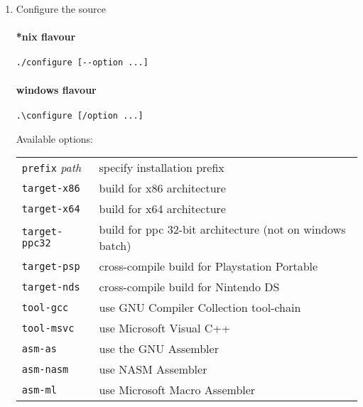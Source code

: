 \begin{enumerate}
\item Configure the source

\paragraph{*nix flavour}
\begin{lstlisting}
./configure [--option ...]
\end{lstlisting}

\paragraph{windows flavour}

\begin{lstlisting}
.\configure [/option ...]
\end{lstlisting}

Available options:

\begin{tabular}{ll}	
{\tt prefix} {\it path} & specify installation prefix \\
{\tt target-x86}   & build for x86 architecture \\
{\tt target-x64}   & build for x64 architecture \\
{\tt target-ppc32} & build for ppc 32-bit architecture (not on windows batch)\\
{\tt target-psp}   & cross-compile build for Playstation Portable \\
{\tt target-nds}   & cross-compile build for Nintendo DS \\
{\tt tool-gcc}     & use GNU Compiler Collection tool-chain \\
{\tt tool-msvc}    & use Microsoft Visual C++ \\
{\tt asm-as}       & use the GNU Assembler \\
{\tt asm-nasm}     & use NASM Assembler \\
{\tt asm-ml}       & use Microsoft Macro Assembler \\
\end{tabular}


\end{enumerate}
